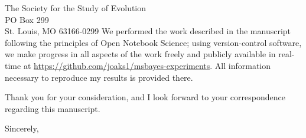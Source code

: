 \documentclass[letterpaper]{letter}
\begin{document}
\begin{letter}{The Society for the Study of Evolution \\
                     PO Box 299 \\
                     St. Louis, MO 63166-0299}
We performed the work described in the manuscript following the principles of
Open Notebook Science; using version-control software, we make progress in all
aspects of the work freely and publicly available in real-time at
\href{https://github.com/joaks1/msbayes-experiments}{\url{https://github.com/joaks1/msbayes-experiments}}.
All information necessary to reproduce my results is provided there.

Thank you for your consideration, and I look forward to your correspondence
regarding this manuscript.

\addtolength{\medskipamount}{-5pt}
\closing{Sincerely,}
\end{letter}
\end{document}
